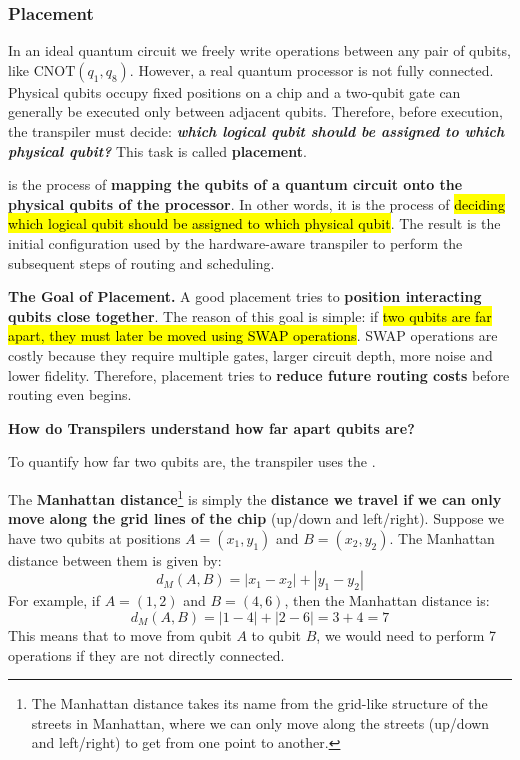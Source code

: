 \subsubsection{Placement}\label{sec:placement}

In an ideal quantum circuit we freely write operations between any pair of qubits, like $\text{CNOT}(q_1, q_8)$. However, a real quantum processor is not fully connected. Physical qubits occupy fixed positions on a chip and a two-qubit gate can generally be executed only between adjacent qubits. Therefore, before execution, the transpiler must decide: \emph{\textbf{which logical qubit should be assigned to which physical qubit?}} This task is called \textbf{placement}.

\highspace
\begin{definitionbox}[: Placement]
     is the process of \textbf{mapping the qubits of a quantum circuit onto the physical qubits of the processor}. In other words, it is the process of \hl{deciding which logical qubit should be assigned to which physical qubit}. The result is the initial configuration used by the hardware-aware transpiler to perform the subsequent steps of routing and scheduling.
\end{definitionbox}

\highspace
\textcolor{Green3}{ \textbf{The Goal of Placement.}} A good placement tries to \textbf{position interacting qubits close together}. The reason of this goal is simple: if \hl{two qubits are far apart, they must later be moved using SWAP operations}. SWAP operations are costly because they require multiple gates, larger circuit depth, more noise and lower fidelity. Therefore, placement tries to \textbf{reduce future routing costs} before routing even begins.

\highspace
\begin{flushleft}
    \textcolor{Green3}{ \textbf{How do Transpilers understand how far apart qubits are?}}
\end{flushleft}
To quantify how far two qubits are, the transpiler uses the .

\highspace
The \textbf{Manhattan distance}\footnote{The Manhattan distance takes its name from the grid-like structure of the streets in Manhattan, where we can only move along the streets (up/down and left/right) to get from one point to another.} is simply the \textbf{distance we travel if we can only move along the grid lines of the chip} (up/down and left/right). Suppose we have two qubits at positions $A = (x_1, y_1)$ and $B = (x_2, y_2)$. The Manhattan distance between them is given by:
\begin{equation}\label{eq:manhattan-distance}
    d_{M}(A, B) = \left|x_1 - x_2\right| + \left|y_1 - y_2\right|
\end{equation}
For example, if $A = (1, 2)$ and $B = (4, 6)$, then the Manhattan distance is:
\begin{equation*}
    d_{M}(A, B) = |1 - 4| + |2 - 6| = 3 + 4 = 7
\end{equation*}
This means that to move from qubit $A$ to qubit $B$, we would need to perform 7 operations if they are not directly connected.

